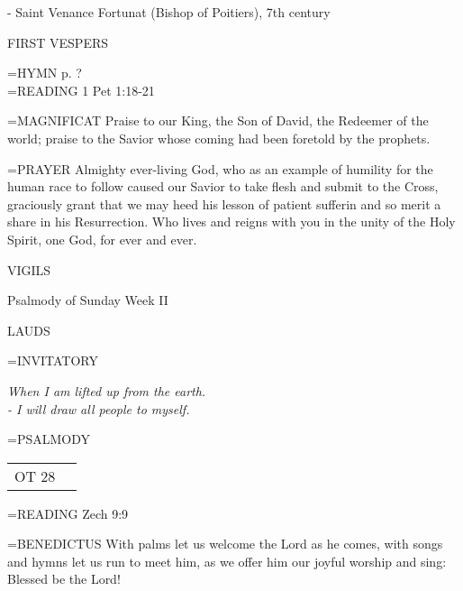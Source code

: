 - Saint Venance Fortunat (Bishop of Poitiers), 7th century

\begin{flushleft}\normalsize FIRST VESPERS\\\end{flushleft}
\hangindent=\parindent \small{\uppercase{HYMN} p.  ?\\}
\hangindent=\parindent \small{READING}    1 Pet 1:18-21 \textbf{   \\}

\hangindent=\parindent \small{MAGNIFICAT 	Praise to our King, the Son of David, the Redeemer of the world; praise to the Savior whose coming had been foretold by the prophets.\\}

\hangindent=\parindent \small{PRAYER 	Almighty ever-living God, who as an example of humility for the human race to follow caused our Savior to take flesh and submit to the Cross, graciously grant that we may heed his lesson of patient sufferin and so merit a share in his Resurrection. Who lives and reigns with you in the unity of the Holy Spirit, one God, for ever and ever.}

\begin{flushleft}\normalsize VIGILS\\\end{flushleft}
Psalmody of Sunday Week II

\begin{flushleft}\normalsize LAUDS\\\end{flushleft}
\hangindent=\parindent \small{INVITATORY}
\begin{center}
\textit{When I am lifted up from the earth.\\}
\textit{- I will draw all people to myself.\\}
\end{center}

\hangindent=\parindent \small{PSALMODY}
\begin{center}
\begin{tabular}{ l l }
OT 28 & \\
\end{tabular}
\end{center}		

\hangindent=\parindent \small{READING}    Zech 9:9 \textbf{   \\}

\hangindent=\parindent \small{BENEDICTUS 	With palms let us welcome the Lord as he comes, with songs and hymns let us run to meet him, as we offer him our joyful worship and sing: Blessed be the Lord!\\}

